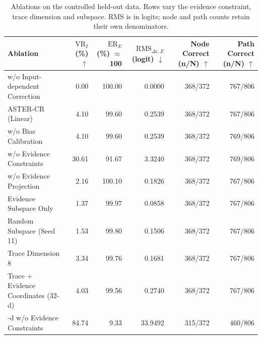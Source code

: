 \begin{table}[t]
\centering
\small
\setlength{\tabcolsep}{3pt}
\begin{tabularx}{\textwidth}{@{}>{\raggedright\arraybackslash}Xrrrrr@{}}
\toprule
Ablation & \shortstack{$\mathrm{VR}_{I}$\\ (\%) $\uparrow$} & \shortstack{$\mathrm{ER}_{E}$\\ (\%) $\approx$100} & \shortstack{$\mathrm{RMS}_{\Delta c,E}$\\ (logit) $\downarrow$} & \shortstack{Node Correct\\ (n/N) $\uparrow$} & \shortstack{Path Correct\\ (n/N) $\uparrow$} \\
\midrule
w/o Input-dependent Correction & 0.00 & 100.00 & 0.0000 & 368/372 & 767/806 \\
ASTER-CR (Linear) & 4.10 & 99.60 & 0.2539 & 368/372 & 767/806 \\
w/o Bias Calibration & 4.10 & 99.60 & 0.2539 & 368/372 & 769/806 \\
w/o Evidence Constraints & 30.61 & 91.67 & 3.3240 & 368/372 & 769/806 \\
w/o Evidence Projection & 2.16 & 100.10 & 0.1826 & 368/372 & 767/806 \\
Evidence Subspace Only & 1.37 & 99.97 & 0.0858 & 368/372 & 767/806 \\
Random Subspace (Seed 11) & 1.53 & 99.80 & 0.1506 & 368/372 & 767/806 \\
Trace Dimension 8 & 3.34 & 99.76 & 0.1681 & 368/372 & 767/806 \\
Trace + Evidence Coordinates (32-d) & 4.03 & 99.56 & 0.2740 & 368/372 & 767/806 \\
32-d w/o Evidence Constraints & 84.74 & 9.33 & 33.9492 & 315/372 & 460/806 \\
\bottomrule
\end{tabularx}
\caption{Ablations on the controlled held-out data. Rows vary the evidence constraint, trace dimension and subspace. RMS is in logits; node and path counts retain their own denominators.}
\label{tab:aster-main-18}
\end{table}

